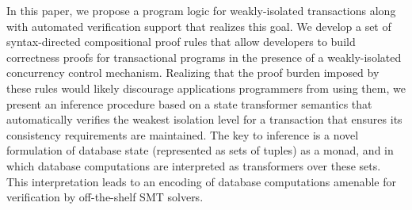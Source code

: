 

In this paper, we propose a program logic for weakly-isolated
transactions along with automated verification support that realizes
this goal.  We develop a set of syntax-directed compositional proof
rules that allow developers to build correctness proofs for
transactional programs in the presence of a weakly-isolated
concurrency control mechanism.  Realizing that the proof burden
imposed by these rules would likely discourage applications
programmers from using them, we present an inference procedure based
on a state transformer semantics that automatically verifies the
weakest isolation level for a transaction that ensures its consistency
requirements are maintained.  The key to inference is a novel formulation
of database state (represented as sets of tuples) as a monad, and in
which database computations are interpreted as transformers over these
sets.  This interpretation leads to an encoding of database
computations amenable for verification by off-the-shelf SMT solvers.

